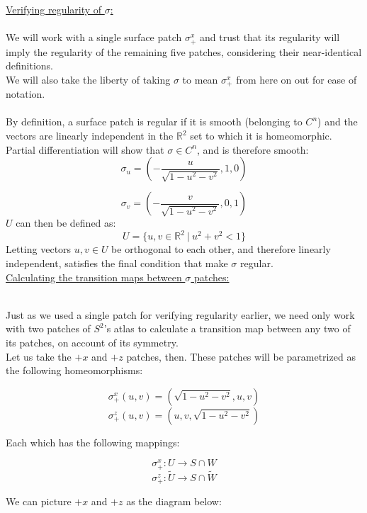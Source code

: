 \documentclass[12pt]{article}
\begin{document}
\clearpage

\underline{Verifying regularity of $\sigma$:}\\\\
\indent
We will work with a single surface patch $\sigma^x_+$ and trust that its regularity will imply the regularity of the remaining five patches, considering their near-identical definitions.\\
\indent
We will also take the liberty of taking $\sigma$ to mean $\sigma^x_+$  from here on out for ease of notation.\\\\
\indent
By definition, a surface patch is regular if it is smooth (belonging to $C^n$) and the vectors are linearly independent in the $\mathbb{R}^2$ set to which it is homeomorphic.\\
\indent
Partial differentiation will show that  $\sigma \in C^n$, and is therefore smooth:
$$
\sigma_u = \left(-\frac{u}{\sqrt{1-u^2-v^2}}, 1 ,0 \right)
$$

$$
\sigma_v = \left(-\frac{v}{\sqrt{1-u^2-v^2}}, 0 ,1 \right)
$$
\indent
$U$ can then be defined as:
$$
U = \lbrace u,v \in \mathbb{R}^2 \ | \ u^2 + v^2 < 1 \rbrace
$$
\indent
Letting vectors $u, v \in U$ be orthogonal to each other, and therefore linearly independent, satisfies the final condition that make $\sigma$ regular.\\

\underline{Calculating the transition maps between $\sigma$ patches:}\\\\
\indent

Just as we used a single patch for verifying regularity earlier, we need only work with two patches of $S^2$'s atlas to calculate a transition map between any two of its patches, on account of its symmetry.\\

Let us take the $+x$ and $+z$ patches, then. These patches will be parametrized as the following homeomorphisms:

$$
\sigma^{x}_{+}(u,v) = (\sqrt{1-u^2-v^2}, u ,v)
$$
$$
\sigma^{z}_{+}(u,v) = (u ,v, \sqrt{1-u^2-v^2})
$$

Each which has the following mappings:

$$
\sigma^{x}_{+} : U \rightarrow S \cap W
$$
$$
\sigma^{z}_{+} : \widetilde{U} \rightarrow S \cap \widetilde{W}
$$

\clearpage

We can picture $+x$ and $+z$ as the diagram below:
\end{document}
